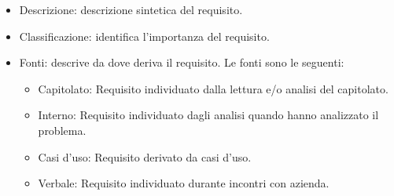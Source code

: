\begin{itemize}
\begin{itemize}
\begin{itemize}
                    \end{itemize}                    
            \end{itemize}
        \item Descrizione: descrizione sintetica del requisito.
        \item Classificazione: identifica l'importanza del requisito.
        \item Fonti: descrive da dove deriva il requisito. Le fonti sono le seguenti:
            \begin{itemize}
                \item Capitolato: Requisito individuato dalla lettura e/o analisi del capitolato.
                \item Interno: Requisito individuato dagli analisi quando hanno analizzato il problema.
                \item Casi d'uso: Requisito derivato da casi d'uso.
                \item Verbale: Requisito individuato durante incontri con azienda.
            \end{itemize}
    \end{itemize}
